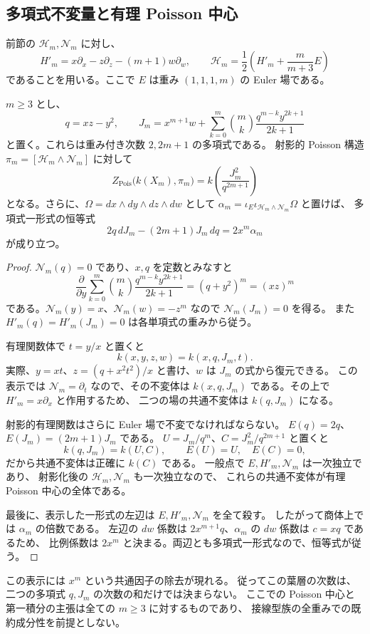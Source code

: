 \subsection{多項式不変量と有理 Poisson 中心}
\label{subsec:affine-casimir-allm-v33}

前節の $\mathcal H_m,\mathcal N_m$ に対し、
\[
 H'_m=x\partial_x-z\partial_z-(m+1)w\partial_w,
 \qquad
 \mathcal H_m=\frac12\left(H'_m+\frac{m}{m+3}E\right)
\]
であることを用いる。ここで $E$ は重み $(1,1,1,m)$ の Euler 場である。

\begin{proposition}[全重みの明示的第一積分]
\label{prop:affine-casimir-allm-v33}
$m\geq3$ とし、
\[
 q=xz-y^2,\qquad
 J_m=x^{m+1}w+
 \sum_{k=0}^m\binom mk\frac{q^{m-k}y^{2k+1}}{2k+1}
\]
と置く。これらは重み付き次数 $2,2m+1$ の多項式である。
射影的 Poisson 構造 $\pi_m=[\mathcal H_m\wedge\mathcal N_m]$ に対して
\[
 Z_{\mathrm{Pois}}\bigl(k(X_m),\pi_m\bigr)
 =k\left(\frac{J_m^2}{q^{2m+1}}\right)
\]
となる。さらに、$\Omega=dx\wedge dy\wedge dz\wedge dw$ として
$\alpha_m=\iota_E\iota_{\mathcal H_m\wedge\mathcal N_m}\Omega$ と置けば、
多項式一形式の恒等式
\[
 \boxed{\quad
 2q\,dJ_m-(2m+1)J_m\,dq=2x^m\alpha_m
 \quad}
\]
が成り立つ。
\end{proposition}

\begin{proof}
$\mathcal N_m(q)=0$ であり、$x,q$ を定数とみなすと
\[
 \frac{\partial}{\partial y}
 \sum_{k=0}^m\binom mk\frac{q^{m-k}y^{2k+1}}{2k+1}
 =(q+y^2)^m=(xz)^m
\]
である。$\mathcal N_m(y)=x$、$\mathcal N_m(w)=-z^m$ なので
$\mathcal N_m(J_m)=0$ を得る。
また $H'_m(q)=H'_m(J_m)=0$ は各単項式の重みから従う。

有理関数体で $t=y/x$ と置くと
\[
 k(x,y,z,w)=k(x,q,J_m,t).
\]
実際、$y=xt$、$z=(q+x^2t^2)/x$ と書け、$w$ は $J_m$ の式から復元できる。
この表示では $\mathcal N_m=\partial_t$ なので、その不変体は
$k(x,q,J_m)$ である。その上で $H'_m=x\partial_x$ と作用するため、
二つの場の共通不変体は $k(q,J_m)$ になる。

射影的有理関数はさらに Euler 場で不変でなければならない。
$E(q)=2q$、$E(J_m)=(2m+1)J_m$ である。
$U=J_m/q^m$、$C=J_m^2/q^{2m+1}$ と置くと
\[
 k(q,J_m)=k(U,C),\qquad E(U)=U,\quad E(C)=0,
\]
だから共通不変体は正確に $k(C)$ である。
一般点で $E,H'_m,\mathcal N_m$ は一次独立であり、
射影化後の $\mathcal H_m,\mathcal N_m$ も一次独立なので、
これらの共通不変体が有理 Poisson 中心の全体である。

最後に、表示した一形式の左辺は $E,H'_m,\mathcal N_m$ を全て殺す。
したがって商体上では $\alpha_m$ の倍数である。
左辺の $dw$ 係数は $2x^{m+1}q$、$\alpha_m$ の $dw$ 係数は $c=xq$ であるため、
比例係数は $2x^m$ と決まる。両辺とも多項式一形式なので、恒等式が従う。
\end{proof}

この表示には $x^m$ という共通因子の除去が現れる。
従ってこの葉層の次数は、二つの多項式 $q,J_m$ の次数の和だけでは決まらない。
ここでの Poisson 中心と第一積分の主張は全ての $m\geq3$ に対するものであり、
接線型族の全重みでの既約成分性を前提としない。
